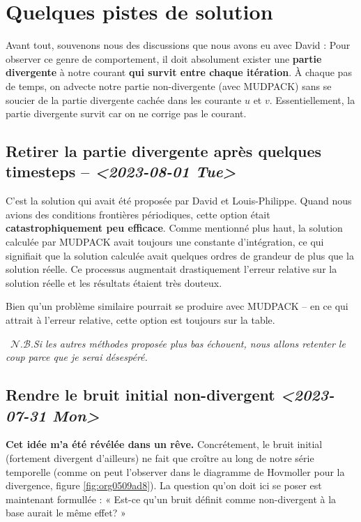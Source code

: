 \documentclass[10pt]{article}
\numberwithin{equation}{section}
\newcommand{\nb}{\raisebox{0.8pt}{\scriptsize\textleaf}\ $\mathscr{N. B.}$\hspace{4pt}}
\begin{document}
\section{Quelques pistes de solution}
\label{sec:org156cabe}
Avant tout, souvenons nous des discussions que nous avons eu avec David : 
Pour observer ce genre de comportement, il doit absolument exister une \textbf{partie divergente} à notre courant \textbf{qui survit entre chaque itération}.
À chaque pas de temps, on advecte notre partie non-divergente (avec MUDPACK) sans se soucier de la partie divergente cachée dans les courante \(u\) et \(v\).
Essentiellement, la partie divergente survit car on ne corrige pas le courant.


\subsection{Retirer la partie divergente après quelques timesteps -- \textit{<2023-08-01 Tue>}}
\label{sec:orgbc099b2}
C'est la solution qui avait été proposée par David et Louis-Philippe.
Quand nous avions des conditions frontières périodiques, cette option était \textbf{catastrophiquement peu efficace}.
Comme mentionné plus haut, la solution calculée par MUDPACK avait toujours une constante d'intégration, ce qui signifiait que la solution calculée avait quelques ordres de grandeur de plus que la solution réelle.
Ce processus augmentait drastiquement l'erreur relative sur la solution réelle et les résultats étaient très douteux.\bigskip

Bien qu'un problème similaire pourrait se produire avec MUDPACK -- en ce qui attrait à l'erreur relative, cette option est toujours sur la table.\bigskip

\nb \emph{Si les autres méthodes proposée plus bas échouent, nous allons retenter le coup parce que je serai désespéré.}

\subsection{Rendre le bruit initial non-divergent \textit{<2023-07-31 Mon>}}
\label{sec:org8631702}
\textbf{Cet idée m'a été révélée dans un rêve.}
Concrétement, le bruit initial (fortement divergent d'ailleurs) ne fait que croître au long de notre série temporelle (comme on peut l'observer dans le diagramme de Hovmoller pour la divergence, figure \ref{fig:org0509ad8}).
La question qu'on doit ici se poser est maintenant formullée : « Est-ce qu'un bruit définit comme non-divergent à la base aurait le même effet? »\bigskip
\end{document}
